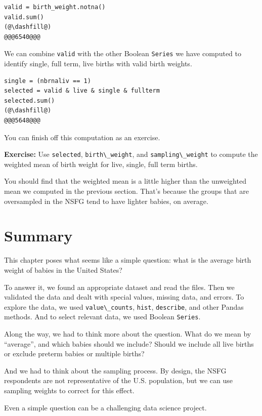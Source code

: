 \begin{lstlisting}[]
valid = birth_weight.notna()
valid.sum()
(@\dashfill@)
@@@6540@@@
\end{lstlisting}

We can combine \passthrough{\lstinline!valid!} with the other Boolean
\passthrough{\lstinline!Series!} we have computed to identify single,
full term, live births with valid birth weights.

\begin{lstlisting}[]
single = (nbrnaliv == 1)
selected = valid & live & single & fullterm
selected.sum()
(@\dashfill@)
@@@5648@@@
\end{lstlisting}

You can finish off this computation as an exercise.

\textbf{Exercise:} Use \passthrough{\lstinline!selected!},
\passthrough{\lstinline!birth\_weight!}, and
\passthrough{\lstinline!sampling\_weight!} to compute the weighted mean
of birth weight for live, single, full term births.

You should find that the weighted mean is a little higher than the
unweighted mean we computed in the previous section. That's because the
groups that are oversampled in the NSFG tend to have lighter babies, on
average.

\hypertarget{summary}{%
\section{Summary}\label{summary}}

This chapter poses what seems like a simple question: what is the
average birth weight of babies in the United States?

To answer it, we found an appropriate dataset and read the files. Then
we validated the data and dealt with special values, missing data, and
errors. To explore the data, we used
\passthrough{\lstinline!value\_counts!}, \passthrough{\lstinline!hist!},
\passthrough{\lstinline!describe!}, and other Pandas methods. And to
select relevant data, we used Boolean \passthrough{\lstinline!Series!}.

Along the way, we had to think more about the question. What do we mean
by ``average'', and which babies should we include? Should we include
all live births or exclude preterm babies or multiple births?

And we had to think about the sampling process. By design, the NSFG
respondents are not representative of the U.S. population, but we can
use sampling weights to correct for this effect.

Even a simple question can be a challenging data science project.

